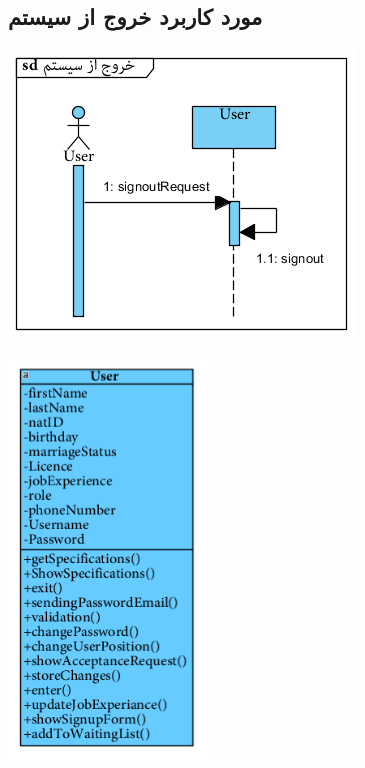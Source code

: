 \subsection*{مورد کاربرد خروج از سیستم}
\vspace{2cm}
\begin{center}
\includegraphics[width=\textwidth]{SequenceDiagrams/14.png}
\end{center}

\newpage
\vspace{2cm}
\begin{center}
\includegraphics[width=0.4\textwidth]{SequenceClasses/14.png}
\end{center}

